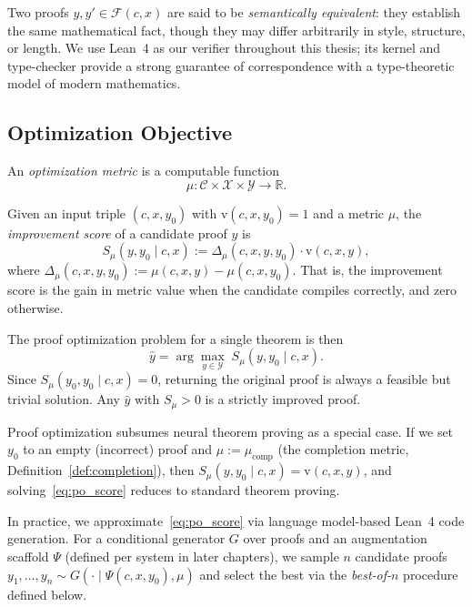 Two proofs $y,y'\in\mathcal{F}(c,x)$ are said to be \emph{semantically equivalent}: they establish the same mathematical fact, though they may differ arbitrarily in style, structure, or length. We use Lean~4 \cite{LeanTheoremProver} as our verifier throughout this thesis; its kernel and type-checker provide a strong guarantee of correspondence with a type-theoretic model of modern mathematics.

\subsection{Optimization Objective}
\label{sec:objective}

\begin{definition}
An \emph{optimization metric} is a computable function
\[
\mu:\mathcal{C}\times\mathcal{X}\times\mathcal{Y}\to\mathbb{R}.
\]
\end{definition}

\begin{definition}
\label{def:improvement_score}
Given an input triple $(c, x, y_0)$ with $\mathrm{v}(c,x,y_0)=1$ and a metric $\mu$, the \emph{improvement score} of a candidate proof $y$ is
\[
S_\mu(y, y_0 \mid c, x) := \Delta_\mu(c,x,y,y_0) \cdot \mathrm{v}(c,x,y),
\]
where $\Delta_\mu(c,x,y,y_0) := \mu(c,x,y) - \mu(c,x,y_0)$.
That is, the improvement score is the gain in metric value when the candidate compiles correctly, and zero otherwise.
\end{definition}

The proof optimization problem for a single theorem is then
\begin{equation}
\label{eq:po_score}
\hat{y} = \arg\max_{y \in \mathcal{Y}}\; S_\mu(y, y_0 \mid c, x).
\end{equation}
Since $S_\mu(y_0, y_0 \mid c, x) = 0$, returning the original proof is always a feasible but trivial solution. Any $\hat{y}$ with $S_\mu > 0$ is a strictly improved proof.

\begin{remark}
Proof optimization subsumes neural theorem proving as a special case. If we set $y_0$ to an empty (incorrect) proof and $\mu := \mu_{\mathrm{comp}}$ (the completion metric, Definition~\ref{def:completion}), then $S_\mu(y, y_0 \mid c, x) = \mathrm{v}(c,x,y)$, and solving~\eqref{eq:po_score} reduces to standard theorem proving.
\end{remark}

In practice, we approximate~\eqref{eq:po_score} via language model-based Lean~4 code generation. For a conditional generator $G$ over proofs and an augmentation scaffold $\Psi$ (defined per system in later chapters), we sample $n$ candidate proofs $y_1,\dots,y_n \sim G(\cdot \mid \Psi(c,x,y_0), \mu)$ and select the best via the \emph{best-of-$n$} procedure defined below.

